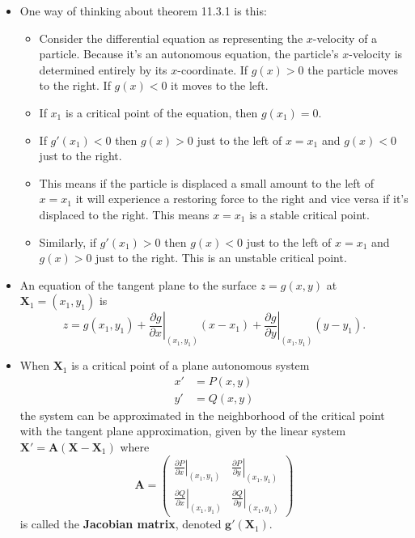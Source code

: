 \documentclass{article}
\begin{document}
\begin{itemize}
  \item One way of thinking about theorem 11.3.1 is this:

        \begin{itemize}
          \item Consider the differential equation as representing the $x$-velocity of a particle. Because it's an autonomous equation, the particle's $x$-velocity is determined entirely by its $x$-coordinate. If $g(x) > 0$ the particle moves to the right. If $g(x) < 0$ it moves to the left.

          \item If $x_1$ is a critical point of the equation, then $g(x_1) = 0$.

          \item If $g'(x_1) < 0$ then $g(x) > 0$ just to the left of $x = x_1$ and $g(x) < 0$ just to the right.

          \item This means if the particle is displaced a small amount to the left of $x = x_1$ it will experience a restoring force to the right and vice versa if it's displaced to the right. This means $x = x_1$ is a stable critical point.

          \item Similarly, if $g'(x_1) > 0$ then $g(x) < 0$ just to the left of $x = x_1$ and $g(x) > 0$ just to the right. This is an unstable critical point.
        \end{itemize}

  \item An equation of the tangent plane to the surface $z = g(x, y)$ at $\mathbf{X}_1 = (x_1, y_1)$ is \[z = g(x_1, y_1) + \left. \frac{\partial g}{\partial x} \right|_{(x_1, y_1)} (x - x_1) + \left. \frac{\partial g}{\partial y} \right|_{(x_1, y_1)} (y - y_1).\]

  \item When $\mathbf{X}_1$ is a critical point of a plane autonomous system \begin{align*}
          x' & = P(x, y) \\
          y' & = Q(x, y)
        \end{align*} the system can be approximated in the neighborhood of the critical point with the tangent plane approximation, given by the linear system $\mathbf{X}' = \mathbf{A} (\mathbf{X} - \mathbf{X}_1)$ where \[\mathbf{A} = \begin{pmatrix}
            \left. \frac{\partial P}{\partial x} \right|_{(x_1, y_1)} & \left. \frac{\partial P}{\partial y} \right|_{(x_1, y_1)} \\
            \left. \frac{\partial Q}{\partial x} \right|_{(x_1, y_1)} & \left. \frac{\partial Q}{\partial y} \right|_{(x_1, y_1)}
          \end{pmatrix}\] is called the \textbf{Jacobian matrix}, denoted $\mathbf{g}'(\mathbf{X}_1)$.


\end{itemize}
\end{document}

